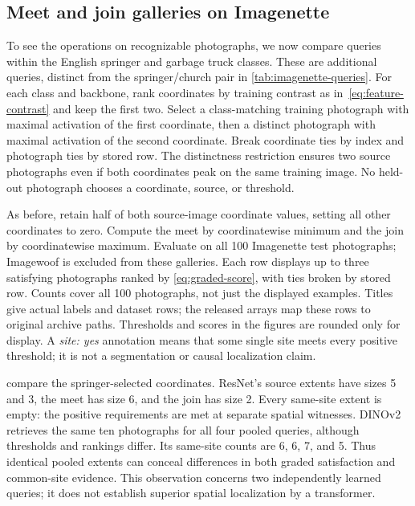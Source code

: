 \subsection{Meet and join galleries on Imagenette}
\label{sub:imagenette-query-galleries}
To see the operations on recognizable photographs, we now compare
queries within the English springer and garbage truck classes. These
are additional queries, distinct from the springer/church pair in
\cref{tab:imagenette-queries}. For each class and backbone, rank
coordinates by training contrast as in~\cref{eq:feature-contrast} and
keep the first two. Select a class-matching training photograph with
maximal activation of the first coordinate, then a distinct photograph
with maximal activation of the second coordinate. Break coordinate ties
by index and photograph ties by stored row. The distinctness restriction
ensures two source photographs even if both coordinates peak on the
same training image. No held-out photograph chooses a coordinate,
source, or threshold.

As before, retain half of both source-image coordinate values, setting
all other coordinates to zero. Compute the meet by coordinatewise
minimum and the join by coordinatewise maximum. Evaluate on all 100
Imagenette test photographs; Imagewoof is excluded from these galleries.
Each row displays up to three satisfying photographs ranked by
\cref{eq:graded-score}, with ties broken by stored row. Counts cover
all 100 photographs, not just the displayed examples. Titles give
actual labels and dataset rows; the released arrays map these rows to
original archive paths. Thresholds and scores in the figures are rounded
only for display. A \emph{site: yes} annotation means that some single
site meets every positive threshold; it is not a segmentation or causal
localization claim.

compare the springer-selected coordinates. ResNet's source extents have
sizes 5 and 3, the meet has size 6, and the join has size 2. Every
same-site extent is empty: the positive requirements are met at
separate spatial witnesses. DINOv2 retrieves the same ten photographs
for all four pooled queries, although thresholds and rankings differ.
Its same-site counts are 6, 6, 7, and 5. Thus identical pooled extents
can conceal differences in both graded satisfaction and common-site
evidence. This observation concerns two independently learned queries;
it does not establish superior spatial localization by a transformer.

